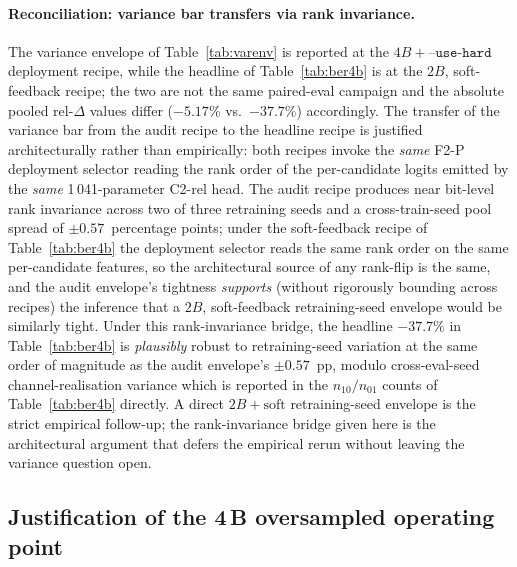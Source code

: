 \paragraph{Reconciliation: variance bar transfers via rank invariance.} The variance envelope of Table~\ref{tab:varenv} is reported at the $4B + \texttt{--use-hard}$ deployment recipe, while the headline of Table~\ref{tab:ber4b} is at the $2B$, soft-feedback recipe; the two are not the same paired-eval campaign and the absolute pooled rel-$\Delta$ values differ ($-5.17\%$ vs.\ $-37.7\%$) accordingly. The transfer of the variance bar from the audit recipe to the headline recipe is justified architecturally rather than empirically: both recipes invoke the \emph{same} F2-P deployment selector reading the rank order of the per-candidate logits emitted by the \emph{same} 1\,041-parameter C2-rel head. The audit recipe produces near bit-level rank invariance across two of three retraining seeds and a cross-train-seed pool spread of $\pm 0.57$~percentage points; under the soft-feedback recipe of Table~\ref{tab:ber4b} the deployment selector reads the same rank order on the same per-candidate features, so the architectural source of any rank-flip is the same, and the audit envelope's tightness \emph{supports} (without rigorously bounding across recipes) the inference that a $2B$, soft-feedback retraining-seed envelope would be similarly tight. Under this rank-invariance bridge, the headline $-37.7\%$ in Table~\ref{tab:ber4b} is \emph{plausibly} robust to retraining-seed variation at the same order of magnitude as the audit envelope's $\pm 0.57$~pp, modulo cross-eval-seed channel-realisation variance which is reported in the $n_{10}/n_{01}$ counts of Table~\ref{tab:ber4b} directly. A direct $2B + \mathrm{soft}$ retraining-seed envelope is the strict empirical follow-up; the rank-invariance bridge given here is the architectural argument that defers the empirical rerun without leaving the variance question open.

\subsection{Justification of the 4\,B oversampled operating point}
\label{ssec:disc_oversampling}

